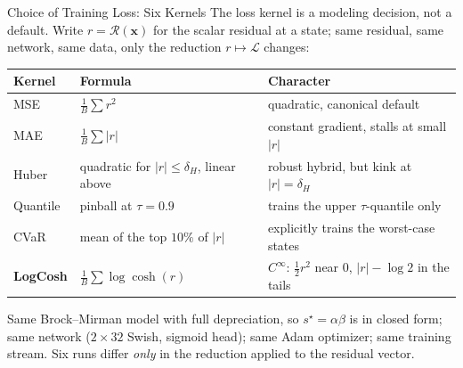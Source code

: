 \documentclass[aspectratio=169,11pt]{beamer}
\newcommand{\emphc}[1]{\textcolor{harvardcrimson}{#1}}
\newcommand{\x}{\bm{x}}
\newcommand{\state}{\bm{x}}          %
\newcommand{\resid}{\mathcal{R}}     %
\begin{document}
\begin{frame}{Choice of Training Loss: Six Kernels}
The loss kernel is a \emphc{modeling decision}, not a default. Write $r = \resid(\state)$ for the scalar residual at a state; same residual, same network, same data, only the reduction $r\mapsto\mathcal{L}$ changes:

\vspace{0.4em}
\begin{center}
\renewcommand{\arraystretch}{1.15}
\setlength{\tabcolsep}{4pt}
{\footnotesize
\begin{tabular}{@{}lll@{}}
\toprule
\textbf{Kernel} & \textbf{Formula} & \textbf{Character} \\
\midrule
MSE      & $\tfrac1B\sum r^2$                                & quadratic, canonical default \\
MAE      & $\tfrac1B\sum |r|$                                 & constant gradient, \emphc{stalls at small $|r|$} \\
Huber    & quadratic for $|r|\le\delta_H$, linear above       & robust hybrid, but \emphc{kink at $|r|=\delta_H$} \\
Quantile & pinball at $\tau=0.9$                              & trains the upper $\tau$-quantile only \\
CVaR     & mean of the top $10\%$ of $|r|$                    & explicitly trains the worst-case states \\
\textbf{LogCosh} & $\tfrac1B\sum\log\cosh(r)$                 & $C^\infty$: $\tfrac12 r^2$ near $0$, $|r|-\log 2$ in the tails \\
\bottomrule
\end{tabular}}
\end{center}

\vspace{0.5em}
{\footnotesize Same Brock--Mirman model with full depreciation, so $s^\star = \alpha\beta$ is in closed form; same network ($2\times32$ Swish, sigmoid head); same Adam optimizer; same training stream. Six runs differ \emph{only} in the reduction applied to the residual vector.}
\end{frame}
\end{document}
